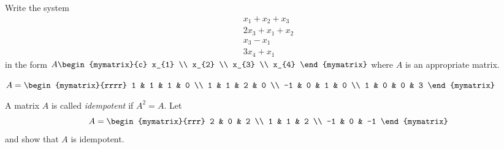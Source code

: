 \begin{enumialphparenastyle}
\begin{ex} Write the system
\begin{equation*}
\begin{array}{c}
x_{1}+x_{2}+x_{3} \\
2x_{3}+x_{1}+x_{2} \\
x_{3}-x_{1} \\
3x_{4}+x_{1}
\end{array}
\end{equation*}
 in the form $A\begin{mymatrix}{c}
x_{1} \\
x_{2} \\
x_{3} \\
x_{4}
\end{mymatrix} $ where $A$ is an appropriate matrix. 
\begin{sol}
$A=\begin{mymatrix}{rrrr}
1 & 1 & 1 & 0 \\
1 & 1 & 2 & 0 \\
-1 & 0 & 1 & 0 \\
1 & 0 & 0 & 3
\end{mymatrix}$
\end{sol}
\end{ex}


\begin{ex} A matrix $A$ is called {\em idempotent \em}if $A^{2}=A.$ 
Let
\begin{equation*}
A=
\begin{mymatrix}{rrr}
2 & 0 & 2 \\
1 & 1 & 2 \\
-1 & 0 & -1
\end{mymatrix}
\end{equation*}
and show that $A$ is idempotent. 
\end{ex}

\end{enumialphparenastyle}
